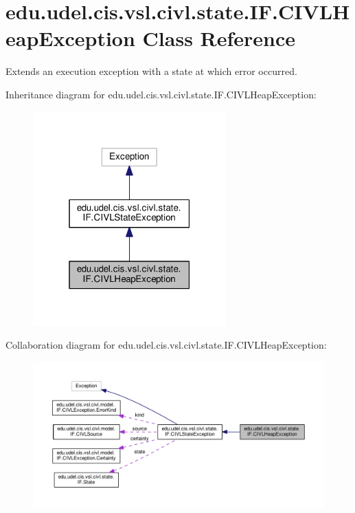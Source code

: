 \hypertarget{classedu_1_1udel_1_1cis_1_1vsl_1_1civl_1_1state_1_1IF_1_1CIVLHeapException}{}\section{edu.\+udel.\+cis.\+vsl.\+civl.\+state.\+I\+F.\+C\+I\+V\+L\+Heap\+Exception Class Reference}
\label{classedu_1_1udel_1_1cis_1_1vsl_1_1civl_1_1state_1_1IF_1_1CIVLHeapException}


Extends an execution exception with a state at which error occurred.  




Inheritance diagram for edu.\+udel.\+cis.\+vsl.\+civl.\+state.\+I\+F.\+C\+I\+V\+L\+Heap\+Exception\+:
\nopagebreak
\begin{figure}[H]
\begin{center}
\leavevmode
\includegraphics[width=211pt]{classedu_1_1udel_1_1cis_1_1vsl_1_1civl_1_1state_1_1IF_1_1CIVLHeapException__inherit__graph}
\end{center}
\end{figure}


Collaboration diagram for edu.\+udel.\+cis.\+vsl.\+civl.\+state.\+I\+F.\+C\+I\+V\+L\+Heap\+Exception\+:
\nopagebreak
\begin{figure}[H]
\begin{center}
\leavevmode
\includegraphics[width=350pt]{classedu_1_1udel_1_1cis_1_1vsl_1_1civl_1_1state_1_1IF_1_1CIVLHeapException__coll__graph}
\end{center}
\end{figure}
